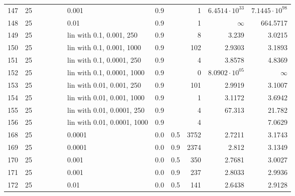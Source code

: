 \begin{longtable}{lrrrrrlrrrrr}
  147 &      25 &   &   &   &   &                       0.001 &      0.9 &        &       1 &  $6.4514\cdot 10^{33}$ &  $7.1445\cdot 10^{98}$ \\
  148 &      25 &   &   &   &   &                        0.01 &      0.9 &        &       1 &               $\infty$ &               664.5717 \\
  149 &      25 &   &   &   &   &    lin with 0.1, 0.001, 250 &      0.9 &        &       8 &                  3.239 &                 3.0215 \\
  150 &      25 &   &   &   &   &   lin with 0.1, 0.001, 1000 &      0.9 &        &     102 &                 2.9303 &                 3.1893 \\
  151 &      25 &   &   &   &   &   lin with 0.1, 0.0001, 250 &      0.9 &        &       4 &                 3.8578 &                 4.8369 \\
  152 &      25 &   &   &   &   &  lin with 0.1, 0.0001, 1000 &      0.9 &        &       0 &  $8.0902\cdot 10^{05}$ &               $\infty$ \\
  153 &      25 &   &   &   &   &   lin with 0.01, 0.001, 250 &      0.9 &        &     101 &                 2.9919 &                 3.1007 \\
  154 &      25 &   &   &   &   &  lin with 0.01, 0.001, 1000 &      0.9 &        &       1 &                 3.1172 &                 3.6942 \\
  155 &      25 &   &   &   &   &  lin with 0.01, 0.0001, 250 &      0.9 &        &       4 &                 67.313 &                 21.782 \\
  156 &      25 &   &   &   &   & lin with 0.01, 0.0001, 1000 &      0.9 &        &       4 &                        &                 7.0629 \\
  168 &      25 &   &   &   &   &                      0.0001 &      0.0 &    0.5 &    3752 &                 2.7211 &                 3.1743 \\
  169 &      25 &   &   &   &   &                      0.0001 &      0.0 &    0.9 &    2374 &                  2.812 &                 3.1349 \\
  170 &      25 &   &   &   &   &                       0.001 &      0.0 &    0.5 &     350 &                 2.7681 &                 3.0027 \\
  171 &      25 &   &   &   &   &                       0.001 &      0.0 &    0.9 &     237 &                 2.8033 &                 2.9936 \\
  172 &      25 &   &   &   &   &                        0.01 &      0.0 &    0.5 &     141 &                 2.6438 &                 2.9128 \\

\end{longtable}
